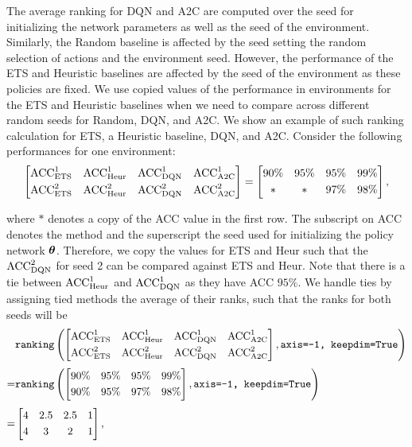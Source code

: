 The average ranking for DQN and A2C are computed over the seed for initializing the network parameters as well as the seed of the environment. Similarly, the Random baseline is affected by the seed setting the random selection of actions and the environment seed. However, the performance of the ETS and Heuristic baselines are affected by the seed of the environment as these policies are fixed. We use copied values of the performance in environments for the ETS and Heuristic baselines when we need to compare across different random seeds for Random, DQN, and A2C. We show an example of such ranking calculation for ETS, a Heuristic baseline, DQN, and A2C. Consider the following performances for one environment:
\vspace{2mm}
\begin{align*}
\begin{bmatrix}
{\text{ACC}}_{\text{ETS}}^{1} & {\text{ACC}}_{\text{Heur}}^{1} & {\text{ACC}}_{\text{DQN}}^{1} & {\text{ACC}}_{\text{A2C}}^{1} \\[3pt] {\text{ACC}}_{\text{ETS}}^{2}  & {\text{ACC}}_{\text{Heur}}^{2} & {\text{ACC}}_{\text{DQN}}^{2} & {\text{ACC}}_{\text{A2C}}^{2} 
\end{bmatrix}  
=
\begin{bmatrix}
90\% & 95\% & 95\% & 99\% \\[3pt]
 * & * & 97\% & 98\%  
\end{bmatrix}  ,
\end{align*}

where $*$ denotes a copy of the ACC  value in the first row. The subscript on ACC denotes the method and the superscript the seed used for initializing the policy network ${\bm{\theta}}$. Therefore, we copy the values for ETS and Heur such that the ${\text{ACC}}_{\text{DQN}}^2$ for seed 2 can be compared against ETS and Heur. Note that there is a tie between ${\text{ACC}}_{\text{Heur}}^{1}$ and ${\text{ACC}}_{\text{DQN}}^{1}$ as they have ACC $95\%$. We handle ties by assigning tied methods the average of their ranks, such that the ranks for both seeds will be
\vspace{2mm}
\begin{align*}
&
\texttt{ranking}
\left(
\begin{bmatrix}
{\text{ACC}}_{\text{ETS}}^{1} & {\text{ACC}}_{\text{Heur}}^{1} & {\text{ACC}}_{\text{DQN}}^{1} & {\text{ACC}}_{\text{A2C}}^{1} \\[3pt] {\text{ACC}}_{\text{ETS}}^{2}  & {\text{ACC}}_{\text{Heur}}^{2} & {\text{ACC}}_{\text{DQN}}^{2} & {\text{ACC}}_{\text{A2C}}^{2} 
\end{bmatrix}, \texttt{axis=-1, keepdim=True}  \right) \\[3pt]
= & 
\texttt{ranking}
\left(
\begin{bmatrix}
90\% & 95\% & 95\% & 99\% \\[3pt]
90\% & 95\% & 97\% & 98\%  
\end{bmatrix}, \texttt{axis=-1, keepdim=True}  \right) \\[3pt]
= & 
\begin{bmatrix}
4 & 2.5 & 2.5 & 1 \\[3pt] 
4 & 3 & 2 & 1 
\end{bmatrix},
\end{align*}

